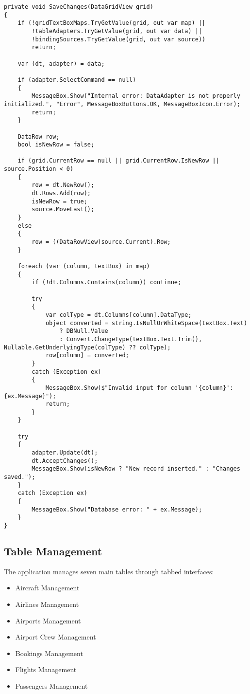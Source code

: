 \documentclass[a4paper,12pt]{article}
\begin{document}
\begin{lstlisting}[language=CSharp, caption=Save Changes Implementation]
private void SaveChanges(DataGridView grid)
{
    if (!gridTextBoxMaps.TryGetValue(grid, out var map) ||
        !tableAdapters.TryGetValue(grid, out var data) ||
        !bindingSources.TryGetValue(grid, out var source))
        return;

    var (dt, adapter) = data;

    if (adapter.SelectCommand == null)
    {
        MessageBox.Show("Internal error: DataAdapter is not properly initialized.", "Error", MessageBoxButtons.OK, MessageBoxIcon.Error);
        return;
    }

    DataRow row;
    bool isNewRow = false;

    if (grid.CurrentRow == null || grid.CurrentRow.IsNewRow || source.Position < 0)
    {
        row = dt.NewRow();
        dt.Rows.Add(row);
        isNewRow = true;
        source.MoveLast();
    }
    else
    {
        row = ((DataRowView)source.Current).Row;
    }

    foreach (var (column, textBox) in map)
    {
        if (!dt.Columns.Contains(column)) continue;

        try
        {
            var colType = dt.Columns[column].DataType;
            object converted = string.IsNullOrWhiteSpace(textBox.Text)
                ? DBNull.Value
                : Convert.ChangeType(textBox.Text.Trim(), Nullable.GetUnderlyingType(colType) ?? colType);
            row[column] = converted;
        }
        catch (Exception ex)
        {
            MessageBox.Show($"Invalid input for column '{column}': {ex.Message}");
            return;
        }
    }

    try
    {
        adapter.Update(dt);
        dt.AcceptChanges();
        MessageBox.Show(isNewRow ? "New record inserted." : "Changes saved.");
    }
    catch (Exception ex)
    {
        MessageBox.Show("Database error: " + ex.Message);
    }
}
\end{lstlisting}

\subsection{Table Management}
The application manages seven main tables through tabbed interfaces:

\begin{itemize}
    \item Aircraft Management
    \item Airlines Management
    \item Airports Management
    \item Airport Crew Management
    \item Bookings Management
    \item Flights Management
    \item Passengers Management
\end{itemize}
\end{document}
